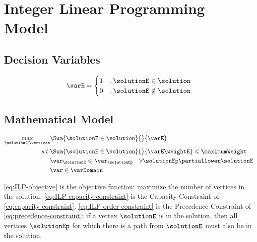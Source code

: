 \section{Integer Linear Programming Model}

\subsection{Decision Variables}

\begin{equation}
    \label{eq:decision-variables}
    \varE =  \begin{cases}
      1 &, \solutionE \in \solution \\
      0 &, \solutionE \notin \solution
   \end{cases}
\end{equation}

\subsection{Mathematical Model}

\begin{align}
    \label{eq:ILP-objective}
    \max\limits_{\solution \subseteq \vertices}
        & \Sum{\solutionE \in \solution}{}{\varE} \\
    s.t.
    \label{eq:ILP-capacity-constraint}
    & \Sum{\solutionE \in \solution}{}{\varE \weightE} \leqslant \maximumWeight \\
    \label{eq:ILP-order-constraint}
    & \var_{\solutionE} \leqslant \var_{\solutionEp} \quad \forall \solutionEp \partialLower \solutionE \\
    \label{eq:ILP-binary-constraint}
    & \var \in \varDomain
\end{align}

\eqref{eq:ILP-objective} is the objective function: maximize the number of vertices in the solution.
\eqref{eq:ILP-capacity-constraint} is the Capacity-Constraint of \eqref{eq:capacity-constraint}.
\eqref{eq:ILP-order-constraint} is the Precedence-Constraint of \eqref{eq:precedence-constraint}: if a vertex $\solutionE$ is in the solution, then all vertices $\solutionEp$ for which there is a path from $\solutionE$ must also be in the solution.
